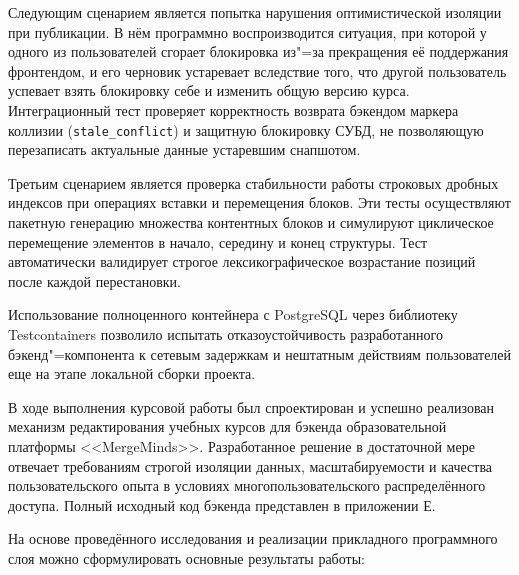 \documentclass[coursework]{SCWorks}
\begin{document}
Следующим сценарием является попытка нарушения оптимистической изоляции при публикации. В нём программно воспроизводится ситуация, при которой у одного из пользователей сгорает блокировка из"=за прекращения её поддержания фронтендом, и его черновик устаревает вследствие того, что другой пользователь успевает взять блокировку себе и изменить общую версию курса. Интеграционный тест проверяет корректность возврата бэкендом маркера коллизии (\texttt{stale\_conflict}) и защитную блокировку СУБД, не позволяющую перезаписать актуальные данные устаревшим снапшотом.

Третьим сценарием является проверка стабильности работы строковых дробных индексов при операциях вставки и перемещения блоков. Эти тесты осуществляют пакетную генерацию множества контентных блоков и симулируют циклическое перемещение элементов в начало, середину и конец структуры. Тест автоматически валидирует строгое лексикографическое возрастание позиций после каждой перестановки.

Использование полноценного контейнера с PostgreSQL через библиотеку Testcontainers позволило испытать отказоустойчивость разработанного бэкенд"=компонента к сетевым задержкам и нештатным действиям пользователей еще на этапе локальной сборки проекта.

\conclusion

В ходе выполнения курсовой работы был спроектирован и успешно реализован механизм редактирования учебных курсов для бэкенда образовательной платформы <<MergeMinds>>. Разработанное решение в достаточной мере отвечает требованиям строгой изоляции данных, масштабируемости и качества пользовательского опыта в условиях многопользовательского распределённого доступа. Полный исходный код бэкенда представлен в приложении Е. 

На основе проведённого исследования и реализации прикладного программного слоя можно сформулировать основные результаты работы:
\end{document}
